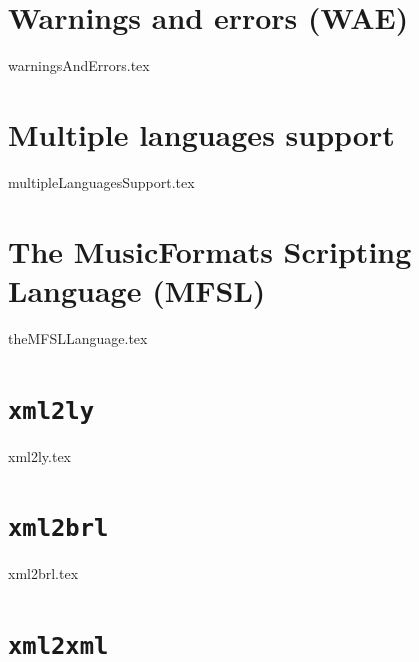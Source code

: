 \documentclass[11pt,a4paper]{report}
\begin{document}


\part{Warnings and errors (WAE)}

{warningsAndErrors.tex}


\part{Multiple languages support}

{multipleLanguagesSupport.tex}


\part{The MusicFormats Scripting Language (MFSL)}

{theMFSLLanguage.tex}


\part{{\tt xml2ly}}

{xml2ly.tex}


\part{{\tt xml2brl}}

{xml2brl.tex}


\part{{\tt xml2xml}}
\end{document}
